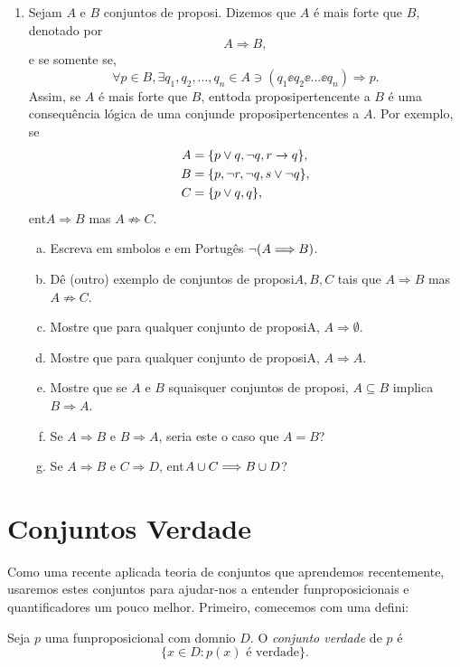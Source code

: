 \begin{enumerate}[{\bf 1.}]
\item Sejam $A$ e $B$ conjuntos de proposi\cois. Dizemos que $A$ \'e mais forte que $B$, denotado por
\[
A\Longrightarrow B,
\]
e se somente se,
\[
\forall p\in B,\exists q_1,q_2,...,q_n \in A \ni (q_1\ee q_2\ee ... \ee q_n)\Rightarrow p.
\]
Assim, se $A$ \'e mais forte que $B$, ent\ao toda proposi\cao pertencente a $B$ \'e uma consequ\^encia l\'ogica de uma conjun\cao de proposi\coes pertencentes a $A$. Por exemplo, se
\begin{equation*}
 \begin{aligned}
A&=\{p\vee q, \lnot q, r\to q\},\\
B&=\{p, \lnot r, \lnot q, s\vee\lnot q\},\\
C&=\{p\vee q,q\},
 \end{aligned}
\end{equation*}
ent\ao $A\Longrightarrow B$ mas $A\not\Longrightarrow C$.
\begin{enumerate}[a)]
\item Escreva em s\ih mbolos e em Portug\^es $\lnot(A\Longrightarrow B)$.
\item D\^e (outro) exemplo de conjuntos de proposi\coes $A,B,C$ tais que $A\Longrightarrow B$ mas $A\not\Longrightarrow C$. 
\item Mostre que para qualquer conjunto de proposi\coes A, $A\Longrightarrow \emptyset$.
\item Mostre que para qualquer conjunto de proposi\coes A, $A\Longrightarrow A$.
\item Mostre que se $A$ e $B$ s\ao quaisquer conjuntos de proposi\cois, $A\subseteq B$ implica $B\Longrightarrow A$.
\item Se $A\Longrightarrow B$ e $B\Longrightarrow A$, seria este o caso que $A=B$?
\item Se $A \Longrightarrow B$ e $C\Longrightarrow D$, ent\ao $A\cup C\Longrightarrow B\cup D$?
\end{enumerate}
\end{enumerate}

\section{Conjuntos Verdade}\label{conjuntosverdade}

Como uma recente aplica\cao  da teoria de conjuntos que aprendemos recentemente, usaremos estes conjuntos para ajudar-nos a entender fun\coes proposicionais e quantificadores um pouco melhor. Primeiro, comecemos com uma defini\caoi:
\begin{definb}
Seja $p$ uma fun\cao proposicional com dom\ih nio $D$. O {\it conjunto verdade} de $p$ \'e
\[
\{x\in D: p(x) \text{ \'e verdade}\}.
\]
\end{definb}

